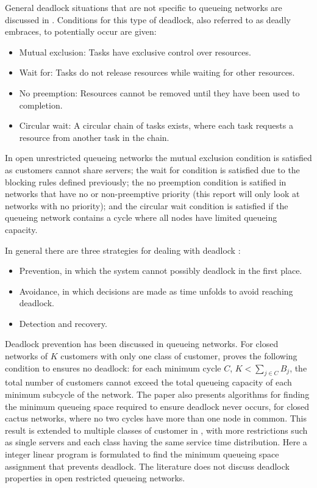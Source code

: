 \documentclass{article}
\begin{document}
General deadlock situations that are not specific to queueing networks are discussed in \cite{coffmanelphick71}.
Conditions for this type of deadlock, also referred to as deadly embraces, to potentially occur are given:
\begin{itemize}
  \item Mutual exclusion: Tasks have exclusive control over resources.
  \item Wait for: Tasks do not release resources while waiting for other resources.
  \item No preemption: Resources cannot be removed until they have been used to completion.
  \item Circular wait: A circular chain of tasks exists, where each task requests a resource from another task in the chain.
\end{itemize}

In open unrestricted queueing networks the mutual exclusion condition is satisfied as customers cannot share servers; the wait for condition is satisfied due to the blocking rules defined previously; the no preemption condition is satified in networks that have no or non-preemptive priority (this report will only look at networks with no priority); and the circular wait condition is satisfied if the queueing network contains a cycle where all nodes have limited queueing capacity.

In general there are three strategies for dealing with deadlock \cite{kawadkaretal14, elmagarmid86}:

\begin{itemize}
  \item Prevention, in which the system cannot possibly deadlock in the first place.
  \item Avoidance, in which decisions are made as time unfolds to avoid reaching deadlock.
  \item Detection and recovery.
\end{itemize}

Deadlock prevention has been discussed in queueing networks.
For closed networks of $K$ customers with only one class of customer, \cite{kunduakyildiz89} proves the following condition to ensures no deadlock: for each minimum cycle $C$, $K < \sum_{j\in C} B_j$, the total number of customers cannot exceed the total queueing capacity of each minimum subcycle of the network.
The paper also presents algorithms for finding the minimum queueing space required to ensure deadlock never occurs, for closed cactus networks, where no two cycles have more than one node in common.
This result is extended to multiple classes of customer in \cite{liebeherrakyildiz95}, with more restrictions such as single servers and each class having the same service time distribution.
Here a integer linear program is formulated to find the minimum queueing space assignment that prevents deadlock.
The literature does not discuss deadlock properties in open restricted queueing networks.
\end{document}
